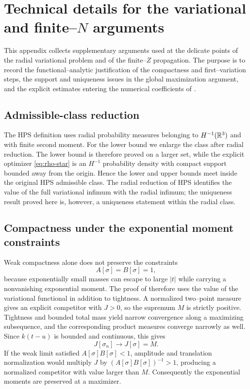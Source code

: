 \section{Technical details for the variational and finite--$N$ arguments}

This appendix collects supplementary arguments used at the delicate points of the radial variational problem and of the finite--$Z$ propagation.  The purpose is to record the functional--analytic justification of the compactness and first--variation steps, the support and uniqueness issues in the global maximization argument, and the explicit estimates entering the numerical coefficients of .

\subsection{Admissible-class reduction}

The HPS definition uses radial probability measures belonging to $H^{-1}(\mathbb{R}^3)$ and with finite second moment.  For the lower bound we enlarge the class after radial reduction.  The lower bound is therefore proved on a larger set, while the explicit optimizer \eqref{eq:rho-star} is an $H^{-1}$ probability density with compact support bounded away from the origin.  Hence the lower and upper bounds meet inside the original HPS admissible class.  The radial reduction of HPS identifies the value of the full variational infimum with the radial infimum; the uniqueness result proved here is, however, a uniqueness statement within the radial class.

\subsection{Compactness under the exponential moment constraints}

Weak compactness alone does not preserve the constraints
\[
 A[\sigma]=B[\sigma]=1,
\]
because exponentially small masses can escape to large $|t|$ while carrying a nonvanishing exponential moment.  The proof of  therefore uses the value of the variational functional in addition to tightness.  A normalized two--point measure gives an explicit competitor with $J>0$, so the supremum $M$ is strictly positive.  Tightness and bounded total mass yield narrow convergence along a maximizing subsequence, and the corresponding product measures converge narrowly as well.  Since $k(t-u)$ is bounded and continuous, this gives
\[
 J[\sigma_n]\longrightarrow J[\sigma]=M.
\]
If the weak limit satisfied $A[\sigma]B[\sigma]<1$, amplitude and translation normalization would multiply $J$ by $(A[\sigma]B[\sigma])^{-1}>1$, producing a normalized competitor with value larger than $M$.  Consequently the exponential moments are preserved at a maximizer.

